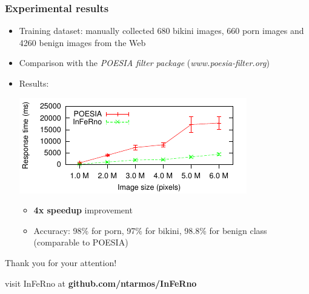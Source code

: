 \documentclass{beamer}
\begin{document}
\begin{frame}
\frametitle{Experimental results}
	\begin{itemize}

		\item Training dataset: manually collected 680 bikini images, 
		      660 porn images and 4260 benign images from the Web

		\item Comparison with the {\em POESIA filter package}  ({\em www.poesia-filter.org})

		\item Results:
	          \begin{center}
		             \includegraphics[scale=1.3]{images/scatter-p-t-all-bars.pdf}
	          \end{center}
			  \begin{itemize}
	                \item \textbf{4x speedup} improvement 
                    \item Accuracy: 98\% for porn, 97\% for bikini, 98.8\% for benign class (comparable to POESIA)
	          \end{itemize}
	\end{itemize}
\end{frame}

\begin{frame}
	\centerline{Thank you for your attention! \smiley}
	\centerline{}
	\centerline{\small{visit InFeRno at \bf{github.com/ntarmos/InFeRno}}}
\end{frame}
\end{document}
